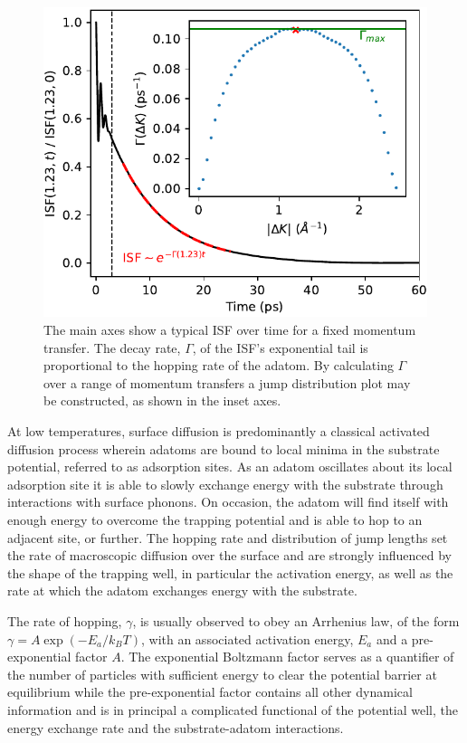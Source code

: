 \documentclass[7pt]{article}
\begin{document}
\begin{figure}
	\centering
	\includegraphics[width=1.0\columnwidth]{isf_dk}
	\caption{The main axes show a typical ISF over time for a fixed momentum transfer. The decay rate, $\Gamma$, of the ISF's exponential tail is proportional to the hopping rate of the adatom. By calculating $\Gamma$ over a range of momentum transfers a jump distribution plot may be constructed, as shown in the inset axes.} 
	\label{fig:isf_dk}
\end{figure}

At low temperatures, surface diffusion is predominantly a classical activated diffusion process\cite{} wherein adatoms are bound to local minima in the substrate potential, referred to as adsorption sites. As an adatom oscillates about its local adsorption site it is able to slowly exchange energy with the substrate through interactions with surface phonons. On occasion, the adatom will find itself with enough energy to overcome the trapping potential and is able to hop to an adjacent site, or further. The hopping rate and distribution of jump lengths set the rate of macroscopic diffusion over the surface and are strongly influenced by the shape of the trapping well, in particular the activation energy, as well as the rate at which the adatom exchanges energy with the substrate.

The rate of hopping, $\gamma$, is usually observed to obey an Arrhenius law, of the form $\gamma = A\exp\left(-E_a/k_BT\right)$, with an associated activation energy, $E_a$ and a pre-exponential factor $A$. The exponential Boltzmann factor serves as a quantifier of the number of particles with sufficient energy to clear the potential barrier at equilibrium while the pre-exponential factor contains all other dynamical information and is in principal a complicated functional of the potential well, the energy exchange rate and the substrate-adatom interactions. 
\end{document}
